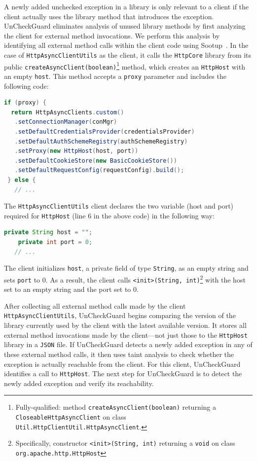 A newly added unchecked exception in a library is only relevant to a client if the client actually uses the library method that introduces the exception. UnCheckGuard eliminates analysis of unused library methods by first analyzing the client for external method invocations. We perform this analysis by identifying all external method calls within the client code using Sootup~\cite{Karakaya24:_sootup}. In the case of \texttt{HttpAsyncClientUtils} as the client, it calls the \texttt{HttpCore} library from its public \texttt{createAsyncClient(boolean)}\footnote{Fully-qualified: method \texttt{createAsyncClient(boolean)} returning a \texttt{CloseableHttpAsyncClient} on class \texttt{Util.HttpClientUtil.HttpAsyncClient}.} method, which creates an \texttt{HttpHost} with an empty \texttt{host}. This method accepts a \texttt{proxy} parameter and includes the following code:

\begin{lstlisting}[language=Java]
 if (proxy) {
  return HttpAsyncClients.custom()
   .setConnectionManager(conMgr)
   .setDefaultCredentialsProvider(credentialsProvider)
   .setDefaultAuthSchemeRegistry(authSchemeRegistry)
   .setProxy(new HttpHost(host, port))
   .setDefaultCookieStore(new BasicCookieStore())
   .setDefaultRequestConfig(requestConfig).build();
 } else {
   // ...
\end{lstlisting}

The \texttt{HttpAsyncClientUtils} client declares the two variable (host and port) required for \texttt{HttpHost} (line 6 in the above code) in the following way:
\begin{lstlisting}[language=Java]
    private String host = "";
    private int port = 0;
   // ...
\end{lstlisting}

The client initializes \texttt{host}, a private field of type \texttt{String}, as an empty string and sets \texttt{port} to 0. As a result, the client calls \texttt{<init>(String, int)}\footnote{Specifically, constructor \texttt{<init>(String, int)} returning a \texttt{void} on class \texttt{org.apache.http.HttpHost}} with the host set to an empty string and the port set to 0.

After collecting all external method calls made by the client \texttt{HttpAsyncClientUtils}, UnCheckGuard begins comparing the version of the library currently used by the client with the latest available version. It stores all external method invocations made by the client—not just those to the \texttt{HttpHost} library in a \texttt{JSON} file. If UnCheckGuard detects a newly added exception in any of these external method calls, it then uses taint analysis to check whether the exception is actually reachable from the client. For this client, UnCheckGuard identifies a call to \texttt{HttpHost}. The next step for UnCheckGuard is to detect the newly added exception and verify its reachability.


